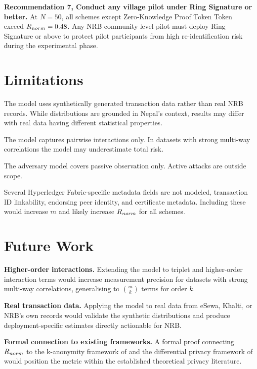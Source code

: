 \textbf{Recommendation 7, Conduct any village pilot under
Ring Signature or better.} At $N = 50$, all schemes except Zero-Knowledge Proof Token
Token exceed $R_{norm} = 0.48$. Any NRB community-level pilot must
deploy Ring Signature or above to protect pilot participants from
high re-identification risk during the experimental phase.

\section{Limitations}
\label{sec:limitations_ch5}

The model uses synthetically generated transaction data rather
than real NRB records. While distributions are grounded in
Nepal's context, results may differ with real data having
different statistical properties.

The model captures pairwise interactions only. In datasets with
strong multi-way correlations the model may underestimate total
risk.

The adversary model covers passive observation only. Active
attacks are outside scope.

Several Hyperledger Fabric-specific metadata fields are not
modeled, transaction ID linkability, endorsing peer identity,
and certificate metadata. Including these would increase $m$ and
likely increase $R_{norm}$ for all schemes.

\section{Future Work}
\label{sec:future_work}

\textbf{Higher-order interactions.} Extending the model to
triplet and higher-order interaction terms would increase
measurement precision for datasets with strong multi-way
correlations, generalising to $\binom{m}{k}$ terms for order $k$.

\textbf{Real transaction data.} Applying the model to real data
from eSewa, Khalti, or NRB's own records would validate the
synthetic distributions and produce deployment-specific estimates
directly actionable for NRB.

\textbf{Formal connection to existing frameworks.} A formal proof
connecting $R_{norm}$ to the k-anonymity framework of
\citet{sweeney2002} and the differential privacy framework of
\citet{dwork2006} would position the metric within the
established theoretical privacy literature.

